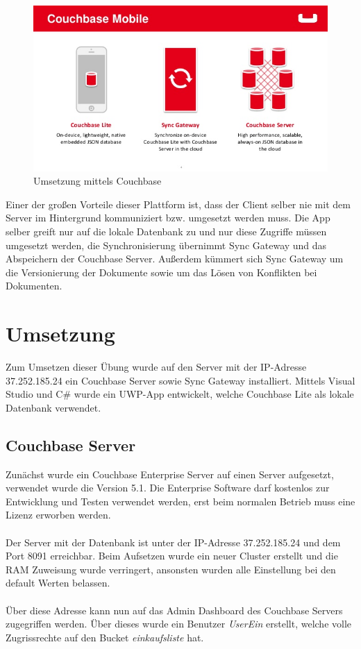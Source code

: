 \begin{figure}[H]
	\centering
	\includegraphics[width=0.9\linewidth]{img/building-net-apps-using-couchbase-lite-4-638}
	\caption{Umsetzung mittels Couchbase}
	\label{fig:building-net-apps-using-couchbase-lite-4-638}
\end{figure}

Einer der großen Vorteile dieser Plattform ist, dass der Client selber nie mit dem Server im Hintergrund kommuniziert bzw. umgesetzt werden muss. Die App selber greift nur auf die lokale Datenbank zu und nur diese Zugriffe müssen umgesetzt werden, die Synchronisierung übernimmt Sync Gateway und das Abspeichern der Couchbase Server. Außerdem kümmert sich Sync Gateway um die Versionierung der Dokumente sowie um das Lösen von Konflikten bei Dokumenten. \cite{couchbaseapp}


\section{Umsetzung}

Zum Umsetzen dieser Übung wurde auf den Server mit der IP-Adresse 37.252.185.24 ein Couchbase Server sowie Sync Gateway installiert. Mittels Visual Studio und C\# wurde ein UWP-App entwickelt, welche Couchbase Lite als lokale Datenbank verwendet.

\subsection{Couchbase Server}

Zunächst wurde ein Couchbase Enterprise Server auf einen Server aufgesetzt, verwendet wurde die Version 5.1. Die Enterprise Software darf kostenlos zur Entwicklung und Testen verwendet werden, erst beim normalen Betrieb muss eine Lizenz erworben werden.
\\\\
Der Server mit der Datenbank ist unter der IP-Adresse 37.252.185.24 und dem Port 8091 erreichbar. Beim Aufsetzen wurde ein neuer Cluster erstellt und die RAM Zuweisung wurde verringert, ansonsten wurden alle Einstellung bei den default Werten belassen.
\\\\
Über diese Adresse kann nun auf das Admin Dashboard des Couchbase Servers zugegriffen werden. Über dieses wurde ein Benutzer \textit{UserEin} erstellt, welche volle Zugrissrechte auf den Bucket \textit{einkaufsliste} hat. \cite{couchbaseintro}

